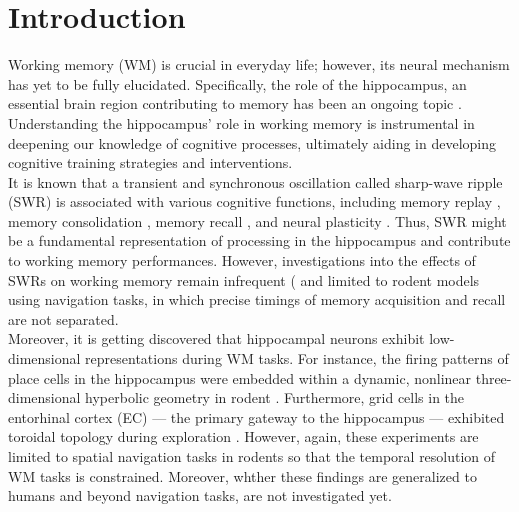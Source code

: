 \section{Introduction}
Working memory (WM) is crucial in everyday life; however, its neural mechanism has yet to be fully elucidated. Specifically, the role of the hippocampus, an essential brain region contributing to memory has been an ongoing topic \cite{scoville_loss_1957} \cite{squire_legacy_2009}  \cite{boran_persistent_2019} \cite{kaminski_persistently_2017} \cite{kornblith_persistent_2017} \cite{faraut_dataset_2018} \cite{borders_hippocampus_2022} \cite{li_functional_2023} \cite{dimakopoulos_information_2022}. Understanding the hippocampus' role in working memory is instrumental in deepening our knowledge of cognitive processes, ultimately aiding in developing cognitive training strategies and interventions.
\\
\indent
It is known that a transient and synchronous oscillation called sharp-wave ripple (SWR) \cite{buzsaki_hippocampal_2015} is associated with various cognitive functions, including memory replay \cite{wilson_reactivation_1994} \cite{nadasdy_replay_1999} \cite{lee_memory_2002} \cite{diba_forward_2007} \cite{davidson_hippocampal_2009}, memory consolidation \cite{girardeau_selective_2009} \cite{ego-stengel_disruption_2010} \cite{fernandez-ruiz_long-duration_2019} \cite{kim_corticalhippocampal_2022}, memory recall \cite{wu_hippocampal_2017} \cite{norman_hippocampal_2019} \cite{norman_hippocampal_2021}, and neural plasticity \cite{behrens_induction_2005} \cite{norimoto_hippocampal_2018}. Thus, SWR might be a fundamental representation of processing in the hippocampus and contribute to working memory performances. However, investigations into the effects of SWRs on working memory remain infrequent (\cite{jadhav_awake_2012} and limited to rodent models using navigation tasks, in which precise timings of memory acquisition and recall are not separated.
\\
\indent
Moreover, it is getting discovered that hippocampal neurons exhibit low-dimensional representations during WM tasks. For instance, the firing patterns of place cells \cite{okeefe_hippocampus_1971} \cite{okeefe_place_1976} \cite{ekstrom_cellular_2003} \cite{kjelstrup_finite_2008} \cite{harvey_intracellular_2009} in the hippocampus were embedded within a dynamic, nonlinear three-dimensional hyperbolic geometry in rodent \cite{zhang_hippocampal_2022}. Furthermore, grid cells in the entorhinal cortex (EC) --- the primary gateway to the hippocampus \cite{naber_reciprocal_2001} \cite{van_strien_anatomy_2009} \cite{strange_functional_2014} --- exhibited toroidal topology during exploration \cite{gardner_toroidal_2022}. However, again, these experiments are limited to spatial navigation tasks in rodents so that the temporal resolution of WM tasks is constrained. Moreover, whther these findings are generalized to humans and beyond navigation tasks, are not investigated yet.

